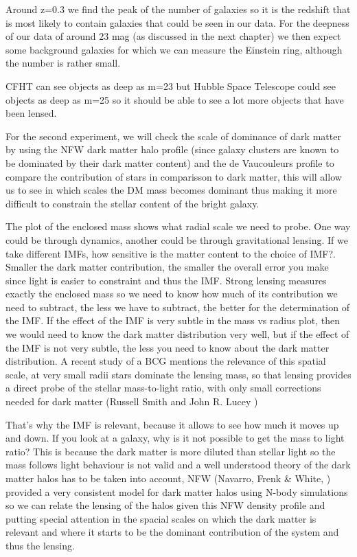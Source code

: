 Around z=0.3 we find the peak of the number of galaxies so it is the redshift that is most likely to contain galaxies that could be seen in our data. For the deepness of our data of around 23 mag (as discussed in the next chapter) we then expect some background galaxies for which we can measure the Einstein ring, although the number is rather small. 

CFHT can see objects as deep as m=23 but Hubble Space Telescope could see objects as deep as m=25 so it should be able to see a lot more objects that have been lensed.

For the second experiment, we will check the scale of dominance of dark matter by using the NFW dark matter halo profile (since galaxy clusters are known to be dominated by their dark matter content) and the de Vaucouleurs profile to compare the contribution of stars in comparisson to dark matter, this will allow us to see in which scales the DM mass becomes dominant thus making it more difficult to constrain the stellar content of the bright galaxy.

The plot of the enclosed mass shows what radial scale we need to probe. One way could be through dynamics, another could be through gravitational lensing. If we take different IMFs, how sensitive is the matter content to the choice of IMF?. Smaller the dark matter contribution, the smaller the overall error you make since light is easier to constraint and thus the IMF. Strong lensing measures exactly the enclosed mass so we need to know how much of its contribution we need to subtract, the less we have to subtract, the better for the determination of the IMF. If the effect of the IMF is very subtle in the mass vs radius plot, then we would need to know the dark matter distribution very well, but if the effect of the IMF is not very subtle, the less you need to know about the dark matter distribution. A recent study of a BCG mentions the relevance of this spatial scale, at very small radii stars dominate the lensing mass, so that lensing provides a direct probe of the stellar mass-to-light ratio, with only small corrections needed for dark matter (Russell Smith and John R. Lucey \citeyear{Reference7}) 

That's why the IMF is relevant, because it allows to see how much it moves up and down. If you look at a galaxy, why is it not possible to get the mass to light ratio? This is because the dark matter is more diluted than stellar light so the mass follows light behaviour is not valid and a well understood theory of the dark matter halos has to be taken into account, NFW (Navarro, Frenk \& White, \citeyear{Reference17}) provided a very consistent model for dark matter halos using N-body simulations so we can relate the lensing of the halos given this NFW density profile and putting special attention in the spacial scales on which the dark matter is relevant and where it starts to be the dominant contribution of the system and thus the lensing.

